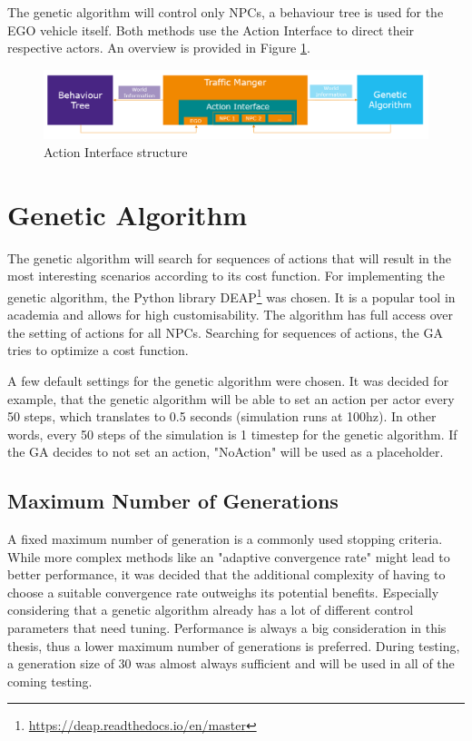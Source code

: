 The genetic algorithm will control only NPCs, a behaviour tree is used for the EGO vehicle itself. Both methods use the Action Interface to direct their respective actors. An overview is provided in Figure \ref{fig:implementation:traffic_manager_structure}.

\begin{figure}[ht] 
	\includegraphics[width=1\linewidth]{figures/tm_structure}
	\caption{Action Interface structure}
	\label{fig:implementation:traffic_manager_structure}
\end{figure}

\section{Genetic Algorithm}
The genetic algorithm will search for sequences of actions that will result in the most interesting scenarios according to its cost function.
For implementing the genetic algorithm, the Python library DEAP\footnote{\url{https://deap.readthedocs.io/en/master}} was chosen. It is a popular tool in academia and allows for high customisability.
The algorithm has full access over the setting of actions for all NPCs. Searching for sequences of actions, the GA tries to optimize a cost function.

A few default settings for the genetic algorithm were chosen. It was decided for example, that the genetic algorithm will be able to set an action per actor every 50 steps, which translates to 0.5 seconds (simulation runs at 100hz). In other words, every 50 steps of the simulation is 1 timestep for the genetic algorithm. If the GA decides to not set an action, "NoAction" will be used as a placeholder.

\subsection{Maximum Number of Generations}
A fixed maximum number of generation is a commonly used stopping criteria. While more complex methods like an "adaptive convergence rate" might lead to better performance, it was decided that the additional complexity of having to choose a suitable convergence rate outweighs its potential benefits. Especially considering that a genetic algorithm already has a lot of different control parameters that need tuning. Performance is always a big consideration in this thesis, thus a lower maximum number of generations is preferred. During testing, a generation size of 30 was almost always sufficient and will be used in all of the coming testing.

